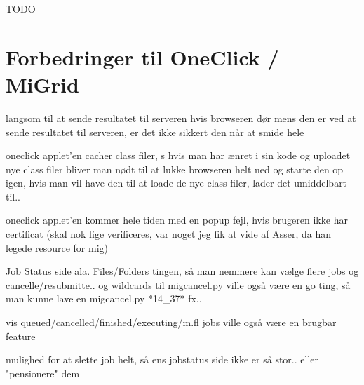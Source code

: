 \documentclass[final,a4paper,10pt]{article}
\begin{document}


TODO
\section{Forbedringer til OneClick / MiGrid}
%
langsom til at sende resultatet til serveren hvis browseren dør mens den er ved
at sende resultatet til serveren, er det ikke sikkert den når at smide hele

oneclick applet'en cacher class filer, s hvis man har ænret i sin kode og
uploadet nye class filer bliver man nødt til at lukke browseren helt ned og
starte den op igen, hvis man vil have den til at loade de nye class filer, lader
det umiddelbart til.. 

oneclick applet'en kommer hele tiden med en popup fejl, hvis brugeren ikke har
certificat (skal nok lige verificeres, var noget jeg fik at vide af Asser, da
han legede resource for mig)

Job Status side ala. Files/Folders
tingen, så man nemmere kan vælge flere jobs og cancelle/resubmitte.. og
wildcards til migcancel.py ville også være en go ting, så man kunne lave en
migcancel.py *14\_37* fx.. 

vis queued/cancelled/finished/executing/m.fl jobs ville også være en brugbar feature

mulighed for at slette job helt, så ens jobstatus side ikke er så stor.. eller
"pensionere" dem
\end{document}
